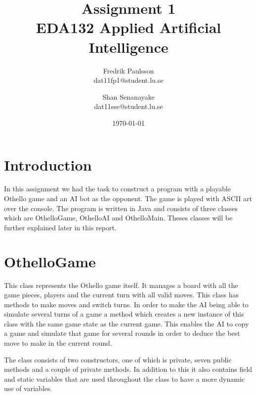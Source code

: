 \documentclass[a4paper]{article}
\title{Assignment 1 \\ EDA132 Applied Artificial Intelligence}
\date{\today}
\author{Fredrik Paulsson \\ dat11fp1@student.lu.se \and Shan Senanayake \\ dat11sse@student.lu.se}
\begin{document}
\maketitle


\section{Introduction}
In this assignment we had the task to construct a program with a playable Othello game and an AI bot as the opponent. The game is played with ASCII art over the console. The program is written in Java and consists of three classes which are OthelloGame, OthelloAI and OthelloMain. Theses classes will be further explained later in this report. \\

\section{OthelloGame}
This class represents the Othello game itself. It manages a board with all the game pieces, players and the current turn with all valid moves. This class has methods to make moves and switch turns. In order to make the AI being able to simulate several turns of a game a method which creates a new instance of this class with the same game state as the current game. This enables the AI to copy a game and simulate that game for several rounds in order to deduce the best move to make in the current round.

The class consists of two constructors, one of which is private, seven public methods and a couple of private methods. In addition to this it also contains field and static variables that are used throughout the class to have a more dynamic use of variables.
\end{document}
